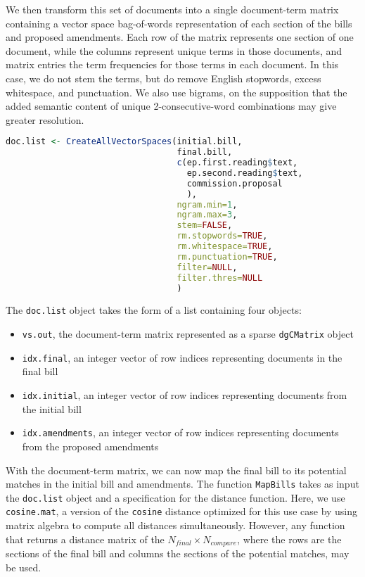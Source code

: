\documentclass[11pt]{article}
\begin{document}
We then transform this set of documents into a single document-term
matrix containing a vector space bag-of-words representation of each
section of the bills and proposed amendments. Each row of the matrix represents one section of one document,
while the columns represent unique terms in those documents, and
matrix entries the term frequencies for those terms in each
document. In this case, we do not stem the terms, but do remove
English stopwords, excess whitespace, and punctuation. We also use
bigrams, on the supposition that the added semantic content of unique
2-consecutive-word combinations may give greater resolution.

\begin{lstlisting}[language=R, numbers=none]
doc.list <- CreateAllVectorSpaces(initial.bill,
                                  final.bill,
                                  c(ep.first.reading$text,
                                    ep.second.reading$text,
                                    commission.proposal
                                    ),
                                  ngram.min=1,
                                  ngram.max=3,
                                  stem=FALSE,
                                  rm.stopwords=TRUE,
                                  rm.whitespace=TRUE,
                                  rm.punctuation=TRUE,
                                  filter=NULL,
                                  filter.thres=NULL
                                  )

\end{lstlisting}

The \texttt{doc.list} object takes the form of a list containing four
objects:
\begin{itemize}
\item \texttt{vs.out}, the document-term matrix represented as a
  sparse \texttt{dgCMatrix} object
\item \texttt{idx.final}, an integer vector of row indices
  representing documents in the final bill
\item \texttt{idx.initial}, an integer vector of row indices
  representing documents from the initial bill
\item \texttt{idx.amendments}, an integer vector of row indices
  representing documents from the proposed amendments
\end{itemize} 

With the document-term matrix, we can now map the final bill to its
potential matches in the initial bill and amendments. The function
\texttt{MapBills} takes as input the \texttt{doc.list} object and a
specification for the distance function. Here, we use
\texttt{cosine.mat}, a version of the \texttt{cosine} distance
optimized for this use case by using matrix algebra to compute all
distances simultaneously. However, any function that returns a
distance matrix of the $N_{final} \times N_{compare}$, where the rows
are the sections of the final bill and columns the sections of the
potential matches, may be used. 
\end{document}
